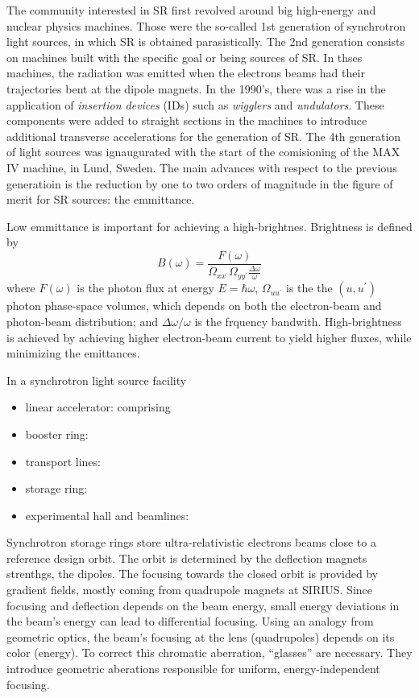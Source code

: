 The community interested in SR first revolved around big high-energy and nuclear physics machines. Those were the so-called 1st generation of synchrotron light sources, in which SR is obtained parasistically. The 2nd generation consists on machines built with the specific goal or being sources of SR. In thses machines, the radiation was emitted when the electrons beams had their trajectories bent at the dipole magnets. In the 1990's, there was a rise in the application of \textit{insertion devices} (IDs) such as \textit{wigglers} and \textit{undulators}. These components were added to straight sections in the machines to introduce additional transverse accelerations for the generation of SR. The 4th generation of light sources was ignaugurated with the start of the comisioning of the MAX IV machine, in Lund, Sweden. The main advances with respect to the previous generatioin is the reduction by one to two orders of magnitude in the figure of merit for SR sources: the emmittance.

Low emmittance is important for achieving a high-brightnes. Brightness is defined by
\begin{equation}
    B(\omega) = \frac{F(\omega)}{\Omega_{xx^\prime}\Omega_{yy^\prime}\frac{\Delta \omega}{\omega}}
\end{equation}
where $F(\omega)$ is the photon flux at energy $E=\hbar\omega$, $\Omega_{uu^\prime}$ is the the $(u,u^\prime)$ photon phase-space volumes, which depends on both the electron-beam and photon-beam distribution; and $\Delta\omega/\omega$ is the frquency bandwith. High-brightness is achieved by achieving higher electron-beam current to yield higher fluxes, while minimizing the emittances.

In a synchrotron light source facility
\begin{itemize}
    \item linear accelerator: comprising
    \item booster ring:
    \item transport lines:
    \item storage ring:
    \item experimental hall and beamlines:
\end{itemize}
Synchrotron storage rings store ultra-relativistic electrons beams close to a reference design orbit. The orbit is determined by the deflection magnets strenthgs, the dipoles. The focusing towards the closed orbit is provided by gradient fields, mostly coming from quadrupole magnets at SIRIUS. Since focusing and deflection depends on the beam energy, small energy deviations in the beam's energy can lead to differential focusing. Using an analogy from geometric optics, the beam's focusing at the lens (quadrupoles) depends on its color (energy). To correct this chromatic aberration, ``glasses'' are necessary. They introduce geometric aberations responsible for uniform, energy-independent focusing.


